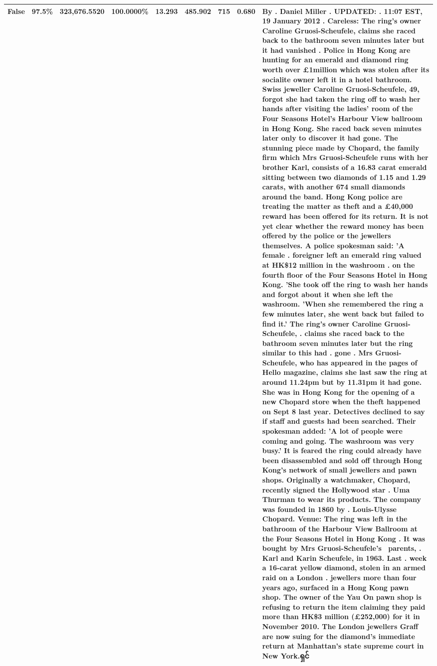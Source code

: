 \begin{table}[H]
\begin{tabular}{lllrlllll}
\cline{1-9}
False & 97.5\% & 323,676.5520 & \bfseries \color{red} 100.0000\% & 13.293 & 485.902 & 715 & 0.680 & By . Daniel Miller . UPDATED: . 11:07 EST, 19 January 2012 . Careless: The ring's owner Caroline Gruosi-Scheufele, claims she raced back to the bathroom seven minutes later but it had vanished . Police in Hong Kong are hunting for an emerald and diamond ring worth over £1million which was stolen after its socialite owner left it in a hotel bathroom. Swiss jeweller Caroline Gruosi-Scheufele, 49, forgot she had taken the ring off to wash her hands after visiting the ladies' room of the Four Seasons Hotel's Harbour View ballroom in Hong Kong. She raced back seven minutes later only to discover it had gone. The stunning piece made by Chopard, the family firm which Mrs Gruosi-Scheufele runs with her brother Karl, consists of a 16.83 carat emerald sitting between two diamonds of 1.15 and 1.29 carats, with another 674 small diamonds around the band. Hong Kong police are treating the matter as theft and a £40,000 reward has been offered for its return. It is not yet clear whether the reward money has been offered by the police or the jewellers themselves. A police spokesman said: 'A female . foreigner left an emerald ring valued at HK\$12 million in the washroom . on the fourth floor of the Four Seasons Hotel in Hong Kong. 'She took off the ring to wash her hands and forgot about it when she left the washroom. 'When she remembered the ring a few minutes later, she went back but failed to find it.' The ring's owner Caroline Gruosi-Scheufele, . claims she raced back to the bathroom seven minutes later but the ring similar to this had . gone . Mrs Gruosi-Scheufele, who has appeared in the pages of Hello magazine, claims she last saw the ring at around 11.24pm but by 11.31pm it had gone. She was in Hong Kong for the opening of a new Chopard store when the theft happened on Sept 8 last year. Detectives declined to say if staff and guests had been searched. Their spokesman added: 'A lot of people were coming and going. The washroom was very busy.' It is feared the ring could already have been disassembled and sold off through Hong Kong's network of small jewellers and pawn shops. Originally a watchmaker, Chopard, recently signed the Hollywood star . Uma Thurman to wear its products. The company was founded in 1860 by . Louis-Ulysse Chopard. Venue: The ring was left in the bathroom of the Harbour View Ballroom at the Four Seasons Hotel in Hong Kong . It was bought by Mrs Gruosi-Scheufele's  parents, . Karl and Karin Scheufele, in 1963. Last . week a 16-carat yellow diamond, stolen in an armed raid on a London . jewellers more than four years ago, surfaced in a Hong Kong pawn shop. The owner of the Yau On pawn shop is refusing to return the item claiming they paid more than HK\$3 million (£252,000) for it in November 2010. The London jewellers Graff are now suing for the diamond’s immediate return at Manhattan’s state supreme court in New York.ရှင် \\
\cline{1-9}
\bottomrule
\end{tabular}
\end{table}
